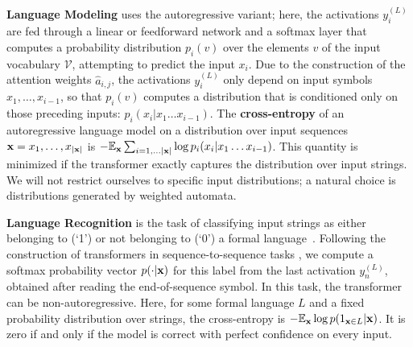 \documentclass[11pt,a4paper]{article}
\newcommand{\key}[1]{\textbf{#1}}
\begin{document}
\key{Language Modeling} uses the autoregressive variant; here, the activations $y_{i}^{(L)}$ are fed through a linear or feedforward network and a softmax layer that computes a probability distribution $p_i(v)$ over the elements $v$ of the input vocabulary $\mathcal{V}$, attempting to predict the input $x_i$.
Due to the construction of the attention weights $\hat{a}_{i,j}$, the activations $y_{i}^{(L)}$ only depend on input symbols $x_1, \dots, x_{i-1}$, so that $p_i(v)$ computes a distribution that is conditioned only on those preceding inputs: $p_i(x_i|x_1\dots x_{i-1})$.
The \key{cross-entropy} of an autoregressive language model on a distribution over input sequences ${\bf x} = x_1, \dots, x_{|{\bf x}|}$ is $- \mathbb{E}_{{\bf x}} \sum_{i=1,\dots |{\bf x}|} \log p_i(x_i|x_1\dots x_{i-1})$.
This quantity is minimized if the transformer exactly captures the distribution over input strings.
We will not restrict ourselves to specific input distributions; a natural choice is distributions generated by weighted automata.




\key{Language Recognition} is the task of classifying input strings as either belonging to (`1') or not belonging to (`0') a formal language~\citep{weiss2018practical}.
Following the construction of transformers in sequence-to-sequence tasks \cite{vaswani2017attention}, we compute a softmax probability vector $p(\cdot|{\bf x})$ for this label from the last activation $y_{n}^{(L)}$, obtained after reading the end-of-sequence symbol.
In this task, the transformer can be non-autoregressive.
Here, for some formal language $L$ and a fixed probability distribution over strings, the cross-entropy is $- \mathbb{E}_{{\bf x}} \log p(1_{{\bf x} \in L}|{\bf x})$.
It is zero if and only if the model is correct with perfect confidence on every input.

\end{document}

